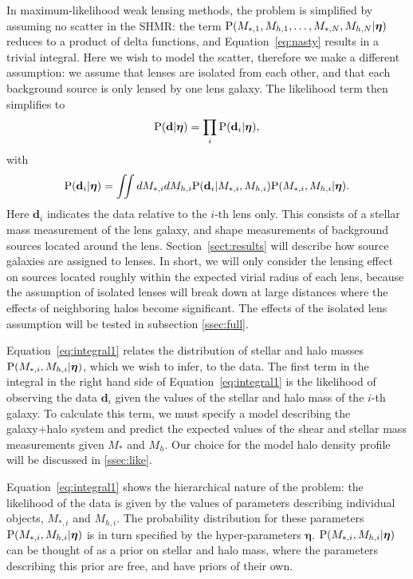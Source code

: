 \documentclass[usenatbib]{mnras}
\def\mstar{M_*}
\def\mstari{M_{*, i}}
\def\mhalo{M_{h}}
\def\mhaloi{M_{h, i}}
\def\hyperp{\boldsymbol{\eta}}
\def\data{\mathbf{d}}
\def\datai{\mathbf{d}_i}
\def\Sref#1{Section~\ref{#1}\xspace}
\def\Eref#1{Equation~\ref{#1}\xspace}
\def\pr{{\rm P}}
\begin{document}
In maximum-likelihood weak lensing methods, the problem is simplified by assuming no scatter in the SHMR: the term $\pr(M_{*,1}, M_{h,1}, \ldots, M_{*,N}, M_{h,N}|\hyperp)$ reduces to a product of delta functions, and \Eref{eq:nasty} results in a trivial integral.
Here we wish to model the scatter, therefore we make a different assumption:
we assume that lenses are isolated from each other, and that each background source is only lensed by one lens galaxy.
The likelihood term then simplifies to
\begin{equation}\label{eq:factorize}
\pr(\data|\hyperp) = \prod_i \pr(\datai|\hyperp),
\end{equation}
with
\begin{equation}\label{eq:integral1}
\pr(\datai|\hyperp) = \iint dM_{*,i} dM_{h,i} \pr(\datai|\mstari, \mhaloi)\pr(\mstari, \mhaloi|\hyperp).
\end{equation}
Here $\datai$ indicates the data relative to the $i$-th lens only. This consists of a stellar mass measurement of the lens galaxy, and shape measurements of background sources located around the lens. \Sref{sect:results} will describe how source galaxies are assigned to lenses. In short, we will only consider the lensing effect on sources located roughly within the expected virial radius of each lens, because the assumption of isolated lenses will break down at large distances where the effects of neighboring halos become significant. The effects of the isolated lens assumption will be tested in subsection \ref{ssec:full}.

\Eref{eq:integral1} relates the distribution of stellar and halo masses $\pr(\mstari, \mhaloi | \hyperp)$, which we wish to infer, to the data.
The first term in the integral in the right hand side of \Eref{eq:integral1} is the likelihood of observing the data $\datai$ given the values of the stellar and halo mass of the $i$-th galaxy. To calculate this term, we must specify a model describing the galaxy+halo system and predict the expected values of the shear and stellar mass measurements given $\mstar$ and $\mhalo$.
Our choice for the model halo density profile will be discussed in \ref{ssec:like}.

\Eref{eq:integral1} shows the hierarchical nature of the problem: the likelihood of the data is given by the values of parameters describing individual objects, $\mstari$ and $\mhaloi$. The probability distribution for these parameters $\pr(\mstari, \mhaloi | \hyperp)$ is in turn specified by the hyper-parameters $\hyperp$. $\pr(\mstari, \mhaloi | \hyperp)$ can be thought of as a prior on stellar and halo mass, where the parameters describing this prior are free, and have priors of their own.
\end{document}
